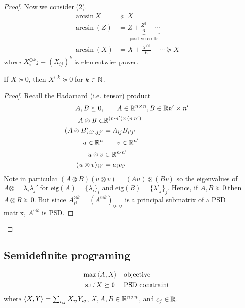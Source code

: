 \begin{proof}
    Now we consider (2).
    \begin{align}
        \arcsin X &\succeq X \\
        \arcsin(Z) &= \underbrace{Z + \frac{Z^3}{6} + \cdots}_{\text{positive coeffs}} \\
        \arcsin(X) &= X + \frac{X^{\odot 3}}{6} + \cdots \succeq X
    \end{align}
    where $X^{\odot k}_ij = (X_{ij})^k$ is elementwise power.

    \begin{lemma}
        If $X \succeq 0$, then $X^{\odot k} \succeq 0$ for $k \in \mathbb{N}$.
    \end{lemma}
    \begin{proof}
        Recall the Hadamard (i.e. tensor) product:
        \begin{align}
            A, B \succeq 0, &\qquad A \in \mathbb{R}^{n \times n}, B \in \mathbb{R}{n' \times n'} \\
            A \otimes B \in &\mathbb{R}^{(n \cdot n') \times (n \cdot n')} \\
            (A \otimes B)_{ii', jj'} &= A_{ij} B_{i'j'} \\
            u \in \mathbb{R}^n &\qquad v \in \mathbb{R}^{n'} \\
            u \otimes v &\in \mathbb{R}^{n \cdot n'} \\
            (u \otimes v)_{i i'} &= u_i v_{i'}
        \end{align}
        Note in particular $(A \otimes B)(u \otimes v) = (A u) \otimes (B v)$
        so the eigenvalues of $A \otimes = \lambda_i \lambda_j'$ for
        $\text{eig}(A) = \{\lambda_i\}_i$ and $\text{eig}(B) = \{\lambda'_j\}_j$.
        Hence, if $A, B \succeq 0$ then $A \otimes B \succeq 0$.
        But since $A^{\odot k}_{ij} = (A^{\otimes k})_{ij,ij}$ is a principal
        submatrix of a PSD matrix, $A^{\odot k}$ is PSD.
    \end{proof}
\end{proof}

\subsection{Semidefinite programing}%

\begin{align}
    \max &\braket{A, X} &&\text{objective} \\
    \text{s.t.}`& X \succeq 0 && \text{PSD constraint} \\
\end{align}
where $\braket{X, Y} = \sum_{i,j} X_{ij} Y_{ij}$,
$X, A, B \in \mathbb{R}^{n \times n}$,
and $c_j \in \mathbb{R}$.

